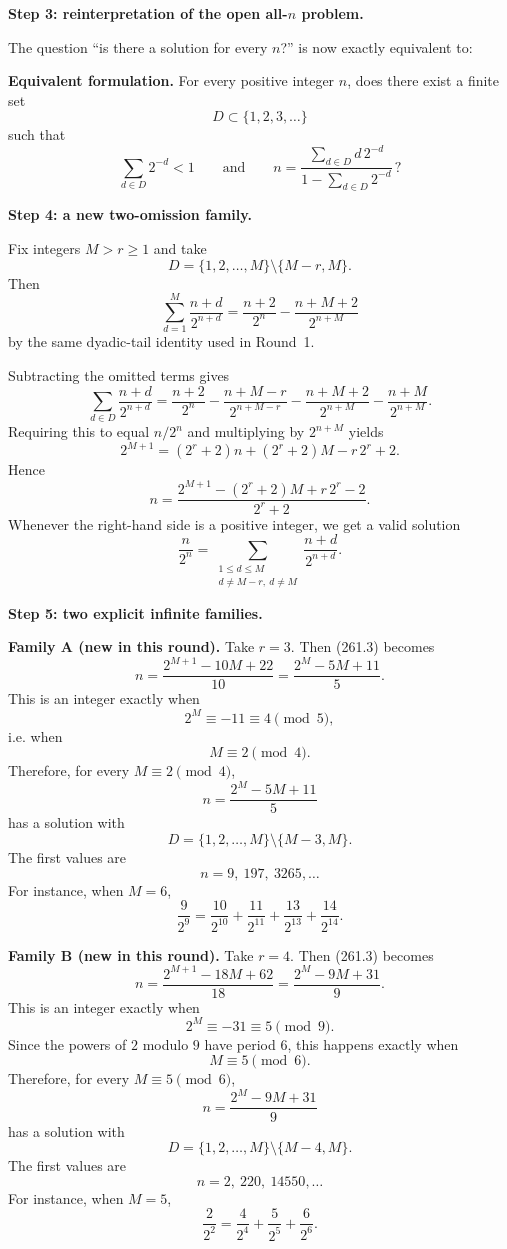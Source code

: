 \medskip
\noindent
\textbf{Step 3: reinterpretation of the open all-$n$ problem.}

The question ``is there a solution for every $n$?'' is now exactly equivalent to:

\medskip
\noindent
\textbf{Equivalent formulation.}
For every positive integer $n$, does there exist a finite set
\[
D\subset \{1,2,3,\dots\}
\]
such that
\[
\sum_{d\in D}2^{-d}<1
\qquad\text{and}\qquad
n=\frac{\sum_{d\in D} d\,2^{-d}}{1-\sum_{d\in D}2^{-d}}\, ?
\]

\medskip
\noindent
\textbf{Step 4: a new two-omission family.}

Fix integers $M>r\geq 1$ and take
\[
D=\{1,2,\dots,M\}\setminus\{M-r,M\}.
\]
Then
\[
\sum_{d=1}^{M}\frac{n+d}{2^{n+d}}
=
\frac{n+2}{2^n}-\frac{n+M+2}{2^{n+M}}
\]
by the same dyadic-tail identity used in Round~1.

Subtracting the omitted terms gives
\[
\sum_{d\in D}\frac{n+d}{2^{n+d}}
=
\frac{n+2}{2^n}
-\frac{n+M-r}{2^{n+M-r}}
-\frac{n+M+2}{2^{n+M}}
-\frac{n+M}{2^{n+M}}.
\]
Requiring this to equal $n/2^n$ and multiplying by $2^{n+M}$ yields
\[
2^{M+1}
=
(2^r+2)n+(2^r+2)M-r\,2^r+2.
\]
Hence
\[
n=
\frac{2^{M+1}-(2^r+2)M+r\,2^r-2}{2^r+2}.
\tag{261.3}
\]
Whenever the right-hand side is a positive integer, we get a valid solution
\[
\frac{n}{2^n}
=
\sum_{\substack{1\leq d\leq M\\ d\neq M-r,\ d\neq M}}
\frac{n+d}{2^{n+d}}.
\]

\medskip
\noindent
\textbf{Step 5: two explicit infinite families.}

\smallskip
\noindent
\textbf{Family A (new in this round).}
Take $r=3$.  Then (261.3) becomes
\[
n=\frac{2^{M+1}-10M+22}{10}
=\frac{2^M-5M+11}{5}.
\]
This is an integer exactly when
\[
2^M\equiv -11\equiv 4 \pmod{5},
\]
i.e. when
\[
M\equiv 2\pmod{4}.
\]
Therefore, for every $M\equiv 2\pmod{4}$,
\[
n=\frac{2^M-5M+11}{5}
\]
has a solution with
\[
D=\{1,2,\dots,M\}\setminus\{M-3,M\}.
\]
The first values are
\[
n=9,\ 197,\ 3265,\dots
\]
For instance, when $M=6$,
\[
\frac{9}{2^9}
=
\frac{10}{2^{10}}+\frac{11}{2^{11}}+\frac{13}{2^{13}}+\frac{14}{2^{14}}.
\]

\smallskip
\noindent
\textbf{Family B (new in this round).}
Take $r=4$.  Then (261.3) becomes
\[
n=\frac{2^{M+1}-18M+62}{18}
=\frac{2^M-9M+31}{9}.
\]
This is an integer exactly when
\[
2^M\equiv -31\equiv 5 \pmod{9}.
\]
Since the powers of $2$ modulo $9$ have period $6$, this happens exactly when
\[
M\equiv 5\pmod{6}.
\]
Therefore, for every $M\equiv 5\pmod{6}$,
\[
n=\frac{2^M-9M+31}{9}
\]
has a solution with
\[
D=\{1,2,\dots,M\}\setminus\{M-4,M\}.
\]
The first values are
\[
n=2,\ 220,\ 14550,\dots
\]
For instance, when $M=5$,
\[
\frac{2}{2^2}
=
\frac{4}{2^4}+\frac{5}{2^5}+\frac{6}{2^6}.
\]

